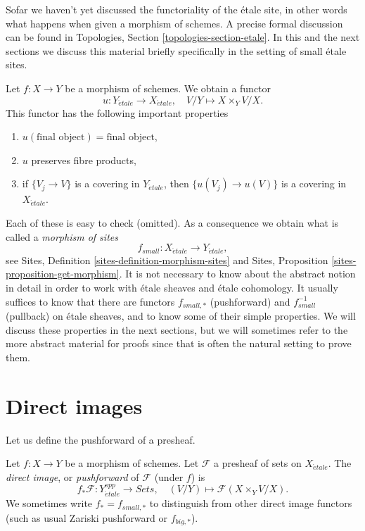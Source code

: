\noindent
Sofar we haven't yet discussed the functoriality of the \'etale site, in
other words what happens when given a morphism of schemes. A precise formal
discussion can be found in
Topologies, Section \ref{topologies-section-etale}.
In this and the next sections we discuss this material briefly specifically
in the setting of small \'etale sites.

\medskip\noindent
Let $f : X \to Y$ be a morphism of schemes. We obtain a functor
\begin{equation}
\label{equation-functorial}
u : Y_{\acute{e}tale} \longrightarrow X_{\acute{e}tale}, \quad
V/Y \longmapsto X \times_Y V/X.
\end{equation}
This functor has the following important properties
\begin{enumerate}
\item $u(\text{final object}) = \text{final object}$,
\item $u$ preserves fibre products,
\item if $\{V_j \to V\}$ is a covering in $Y_{\acute{e}tale}$, then
$\{u(V_j) \to u(V)\}$ is a covering in $X_{\acute{e}tale}$.
\end{enumerate}
Each of these is easy to check (omitted). As a consequence we obtain what
is called a {\it morphism of sites}
$$
f_{small} : X_{\acute{e}tale} \longrightarrow Y_{\acute{e}tale},
$$
see
Sites, Definition \ref{sites-definition-morphism-sites}
and
Sites, Proposition \ref{sites-proposition-get-morphism}.
It is not necessary to know about the abstract notion in detail
in order to work with \'etale sheaves and \'etale cohomology.
It usually suffices to know that there are functors
$f_{small, *}$ (pushforward) and $f_{small}^{-1}$ (pullback)
on \'etale sheaves, and to know some of their simple properties.
We will discuss these properties in the next sections, but we will
sometimes refer to the more abstract material for proofs since
that is often the natural setting to prove them.


\section{Direct images}
\label{section-direct-image}

\noindent
Let us define the pushforward of a presheaf.

\begin{definition}
\label{definition-direct-image-presheaf}
Let $f: X\to Y$ be a morphism of schemes.
Let $\mathcal{F} $ a presheaf of sets on $X_{\acute{e}tale}$.
The {\it direct image}, or {\it pushforward} of $\mathcal{F}$
(under $f$) is
$$
f_*\mathcal{F} : Y_{\acute{e}tale}^{opp} \longrightarrow \textit{Sets}, \quad
(V/Y) \longmapsto \mathcal{F}(X \times_Y V/X).
$$
We sometimes write $f_* = f_{small, *}$ to distinguish from other
direct image functors (such as usual Zariski pushforward or $f_{big, *}$).
\end{definition}

